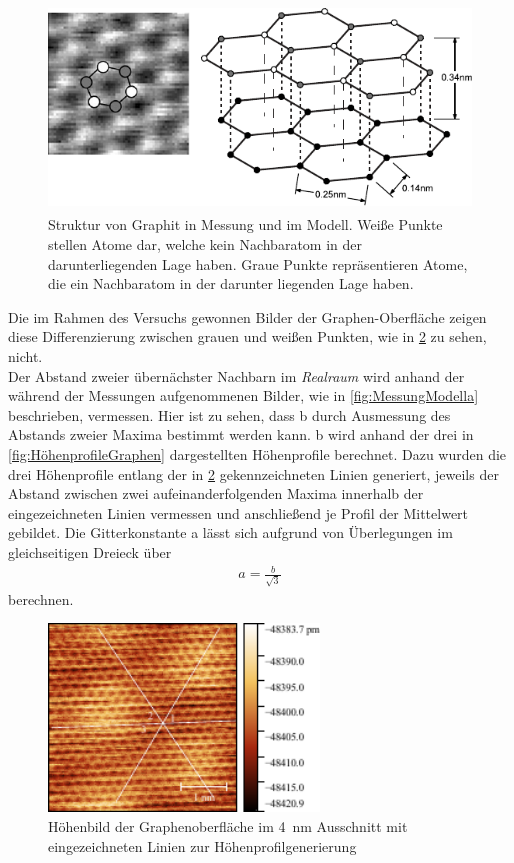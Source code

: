 \documentclass[a4paper,twoside,final]{article}
\begin{document}
\begin{figure}[htp]
    \centering
      \includegraphics[height=5.5cm]{Bilder/Gitterstruktur_Graphen.pdf}
    \caption{Struktur von Graphit in Messung und im Modell. Weiße Punkte stellen Atome dar, welche kein Nachbaratom in der darunterliegenden Lage haben. Graue Punkte repräsentieren Atome, die ein Nachbaratom in der darunter liegenden Lage haben.}
    \label{fig:Graphit}
\end{figure}

Die im Rahmen des Versuchs gewonnen Bilder der Graphen-Oberfläche zeigen diese Differenzierung zwischen grauen und weißen Punkten, wie in \ref{fig:STMBildGraphen} zu sehen, nicht.\\
Der Abstand zweier übernächster Nachbarn im \textit{Realraum} wird anhand der während der Messungen aufgenommenen Bilder, wie in \ref{fig:MessungModella} beschrieben, vermessen. Hier ist zu sehen, dass b durch Ausmessung des Abstands zweier Maxima bestimmt werden kann. b wird anhand der drei in \ref{fig:HöhenprofileGraphen} dargestellten Höhenprofile berechnet. Dazu wurden die drei Höhenprofile entlang der in \ref{fig:STMBildGraphen} gekennzeichneten Linien generiert, jeweils der Abstand zwischen zwei aufeinanderfolgenden Maxima innerhalb der eingezeichneten Linien vermessen und anschließend je Profil der Mittelwert gebildet. Die Gitterkonstante a lässt sich aufgrund von Überlegungen im gleichseitigen Dreieck über
\begin{align}\label{equ:a}
  a = \frac{b}{\sqrt{3}}
\end{align}
berechnen.\\

\begin{figure}[htp]
  \centering
    \includegraphics[height = 5cm]{Bilder/Image02001mitHoehenlinien.pdf}
    \caption{Höhenbild der Graphenoberfläche im \SI{4}{\nano\meter} Ausschnitt mit eingezeichneten Linien zur Höhenprofilgenerierung}
    \label{fig:STMBildGraphen}
\end{figure}
\end{document}
